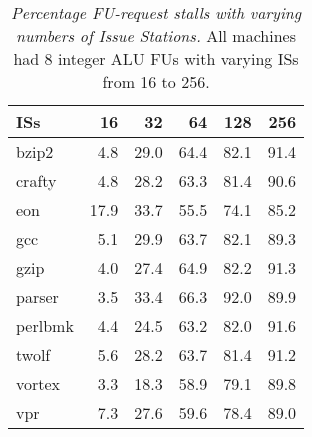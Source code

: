 \documentclass[10pt,dvips]{article}
\begin{document}
%
%
\begin{table}[p]
\begin{center}
\caption{{\em Percentage FU-request stalls
with varying numbers of Issue Stations.}
All machines had 8 integer ALU FUs with varying ISs from 16 to 256.}
\label{tab:iwsize8waits}
\vspace{+0.1in}
\begin{tabular}{|l||r|r|r|r|r|}
\hline 
{ISs}& 16 & 32 & 64 & 128 & 256 \\
\hline

\hline
bzip2&
4.8 & 29.0 & 64.4 & 82.1 & 91.4 \\

\hline
crafty&
4.8 & 28.2 & 63.3 & 81.4 & 90.6 \\

\hline
eon&
17.9 & 33.7 & 55.5 & 74.1 & 85.2 \\

\hline
gcc&
5.1 & 29.9 & 63.7 & 82.1 & 89.3 \\

\hline
gzip&
4.0 & 27.4 & 64.9 & 82.2 & 91.3 \\

\hline
parser&
3.5 & 33.4 & 66.3 & 92.0 & 89.9 \\

\hline
perlbmk&
4.4 & 24.5 & 63.2 & 82.0 & 91.6 \\

\hline
twolf&
5.6 & 28.2 & 63.7 & 81.4 & 91.2 \\

\hline
vortex&
3.3 & 18.3 & 58.9 & 79.1 & 89.8 \\

\hline
vpr&
7.3 & 27.6 & 59.6 & 78.4 & 89.0 \\

\hline
\end{tabular}
\end{center}
\end{table}
%
\end{document}
